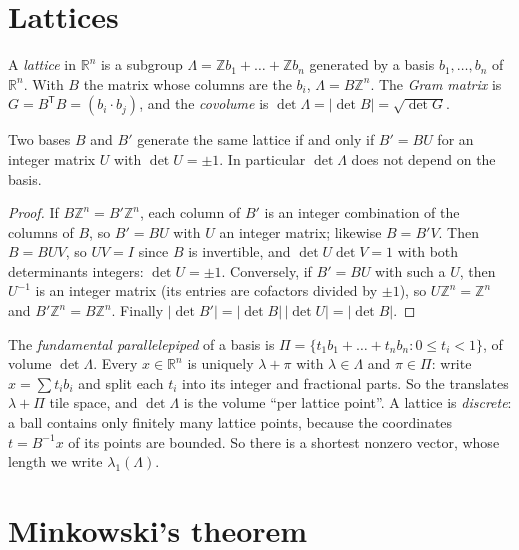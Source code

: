 \section{Lattices}

\begin{definition}
A \emph{lattice} in $\mathbb R^n$ is a subgroup $\Lambda=\mathbb Zb_1+\dots+\mathbb Zb_n$ generated by a basis $b_1,\dots,b_n$ of $\mathbb R^n$. With $B$ the
matrix whose columns are the $b_i$, $\Lambda=B\mathbb Z^n$. The \emph{Gram matrix} is $G=B^{\mathsf T}B=(b_i\cdot b_j)$, and the \emph{covolume} is
$\det\Lambda=|\det B|=\sqrt{\det G}$.
\end{definition}

\begin{proposition}\label{prop:latticebases}
Two bases $B$ and $B'$ generate the same lattice if and only if $B'=BU$ for an integer matrix $U$ with $\det U=\pm1$. In particular $\det\Lambda$ does not
depend on the basis.
\end{proposition}

\begin{proof}
If $B\mathbb Z^n=B'\mathbb Z^n$, each column of $B'$ is an integer combination of the columns of $B$, so $B'=BU$ with $U$ an integer matrix; likewise $B=B'V$. Then
$B=BUV$, so $UV=I$ since $B$ is invertible, and $\det U\det V=1$ with both determinants integers: $\det U=\pm1$. Conversely, if $B'=BU$ with such a $U$, then
$U^{-1}$ is an integer matrix (its entries are cofactors divided by $\pm1$), so $U\mathbb Z^n=\mathbb Z^n$ and $B'\mathbb Z^n=B\mathbb Z^n$. Finally
$|\det B'|=|\det B|\,|\det U|=|\det B|$.
\end{proof}

The \emph{fundamental parallelepiped} of a basis is $\Pi=\{t_1b_1+\dots+t_nb_n:0\le t_i<1\}$, of volume $\det\Lambda$. Every $x\in\mathbb R^n$ is uniquely
$\lambda+\pi$ with $\lambda\in\Lambda$ and $\pi\in\Pi$: write $x=\sum t_ib_i$ and split each $t_i$ into its integer and fractional parts. So the translates
$\lambda+\Pi$ tile space, and $\det\Lambda$ is the volume ``per lattice point''. A lattice is \emph{discrete}: a ball contains only finitely many lattice
points, because the coordinates $t=B^{-1}x$ of its points are bounded. So there is a shortest nonzero vector, whose length we write $\lambda_1(\Lambda)$.

\section{Minkowski's theorem}

